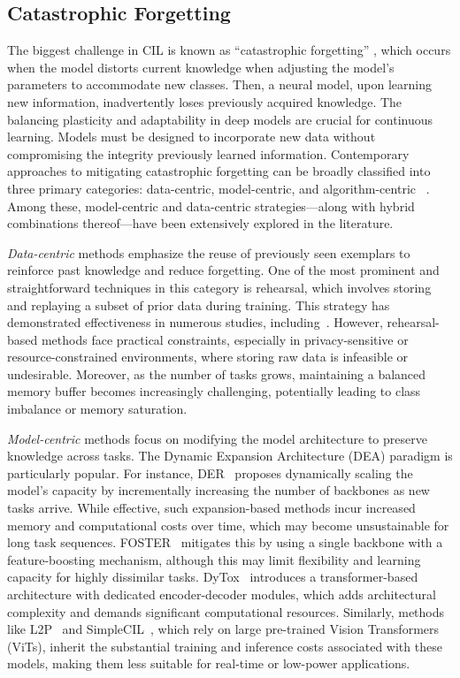 \documentclass[letterpaper]{article} %
\begin{document}
\subsection{Catastrophic Forgetting}
The biggest challenge in CIL is known as ``catastrophic forgetting'' \cite{catastrophic-forgetting}, which occurs when the model distorts current knowledge when adjusting the model's parameters to accommodate new classes. Then, a neural model, upon learning new information, inadvertently loses previously acquired knowledge. The balancing plasticity and adaptability in deep models are crucial for continuous learning. Models must be designed to incorporate new data without compromising the integrity previously learned information.
Contemporary approaches to mitigating catastrophic forgetting can be broadly classified into three primary categories: data-centric, model-centric, and algorithm-centric ~\cite{survey}. Among these, model-centric and data-centric strategies—along with hybrid combinations thereof—have been extensively explored in the literature.

\textit{Data-centric} methods emphasize the reuse of previously seen exemplars to reinforce past knowledge and reduce forgetting. One of the most prominent and straightforward techniques in this category is rehearsal, which involves storing and replaying a subset of prior data during training. This strategy has demonstrated effectiveness in numerous studies, including~\cite{Rebuffi:2007, tcil}. However, rehearsal-based methods face practical constraints, especially in privacy-sensitive or resource-constrained environments, where storing raw data is infeasible or undesirable. Moreover, as the number of tasks grows, maintaining a balanced memory buffer becomes increasingly challenging, potentially leading to class imbalance or memory saturation.

\textit{Model-centric} methods focus on modifying the model architecture to preserve knowledge across tasks. The Dynamic Expansion Architecture (DEA) paradigm is particularly popular. For instance, DER~\cite{Yan:2021} proposes dynamically scaling the model's capacity by incrementally increasing the number of backbones as new tasks arrive. While effective, such expansion-based methods incur increased memory and computational costs over time, which may become unsustainable for long task sequences. FOSTER~\cite{foster} mitigates this by using a single backbone with a feature-boosting mechanism, although this may limit flexibility and learning capacity for highly dissimilar tasks. DyTox~\cite{Douillard:2022} introduces a transformer-based architecture with dedicated encoder-decoder modules, which adds architectural complexity and demands significant computational resources. Similarly, methods like L2P~\cite{l2p} and SimpleCIL~\cite{simplecil}, which rely on large pre-trained Vision Transformers (ViTs), inherit the substantial training and inference costs associated with these models, making them less suitable for real-time or low-power applications.
\end{document}
